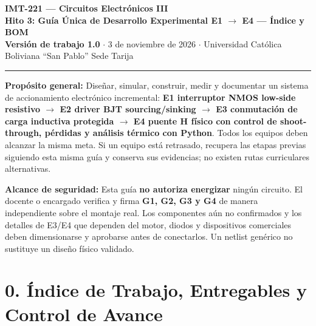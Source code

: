 \documentclass[10pt, a4paper, landscape]{article}
\begin{document}
\noindent
{\LARGE \textbf{\textcolor{ucbblue}{IMT-221 — Circuitos Electrónicos III}}}\\[0.15cm]
{\Large \textbf{Hito 3: Guía Única de Desarrollo Experimental E1 $\rightarrow$ E4 — Índice y BOM}}\\[0.1cm]
{\small \textbf{Versión de trabajo 1.0} $\cdot$ 3 de noviembre de 2026 $\cdot$ Universidad Católica Boliviana ``San Pablo'' Sede Tarija}
\par\vspace{0.2cm}\noindent\rule{\linewidth}{0.4pt}\vspace{0.3cm}

\noindent
\textbf{Propósito general:} Diseñar, simular, construir, medir y documentar un sistema de accionamiento electrónico incremental: \textbf{E1 interruptor NMOS low-side resistivo $\rightarrow$ E2 driver BJT sourcing/sinking $\rightarrow$ E3 conmutación de carga inductiva protegida $\rightarrow$ E4 puente H físico con control de shoot-through, pérdidas y análisis térmico con Python}. Todos los equipos deben alcanzar la misma meta. Si un equipo está retrasado, recupera las etapas previas siguiendo esta misma guía y conserva sus evidencias; no existen rutas curriculares alternativas.

\vspace{0.15cm}
\noindent
\textbf{\textcolor{warnred}{Alcance de seguridad:}} Esta guía \textbf{no autoriza energizar} ningún circuito. El docente o encargado verifica y firma \textbf{G1, G2, G3 y G4} de manera independiente sobre el montaje real. Los componentes aún no confirmados y los detalles de E3/E4 que dependen del motor, diodos y dispositivos comerciales deben dimensionarse y aprobarse antes de conectarlos. Un netlist genérico no sustituye un diseño físico validado.

\section*{0. Índice de Trabajo, Entregables y Control de Avance}
\end{document}
